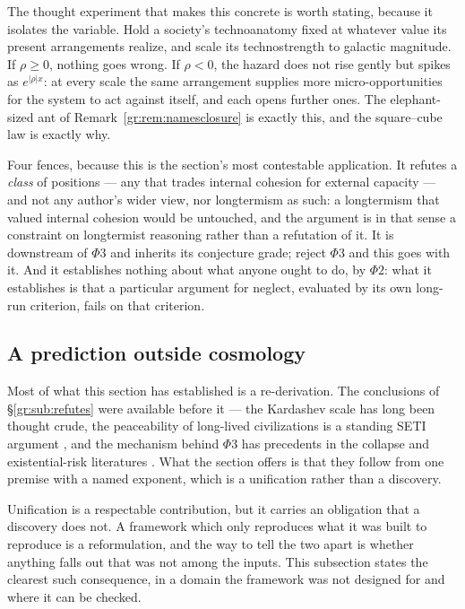 \documentclass[11pt]{article}
\numberwithin{equation}{section}
\theoremstyle{plain}
\theoremstyle{definition}
\theoremstyle{remark}
\begin{document}
The thought experiment that makes this concrete is worth stating,
because it isolates the variable. Hold a society's technoanatomy fixed
at whatever value its present arrangements realize, and scale its
technostrength to galactic magnitude. If $\rho\ge0$, nothing goes
wrong. If $\rho<0$, the hazard does not rise gently but spikes as
$e^{|\rho|x}$: at every scale the same arrangement supplies more
micro-opportunities for the system to act against itself, and each
opens further ones. The elephant-sized ant of
Remark~\ref{gr:rem:namesclosure} is exactly this, and the square--cube
law is exactly why.

Four fences, because this is the section's most contestable
application. It refutes a \emph{class} of positions --- any that trades
internal cohesion for external capacity --- and not any author's wider
view, nor longtermism as such: a longtermism that valued internal
cohesion would be untouched, and the argument is in that sense a
constraint on longtermist reasoning rather than a refutation of it. It is downstream of $\Phi3$ and inherits its conjecture grade;
reject $\Phi3$ and this goes with it. And it establishes nothing about
what anyone ought to do, by $\Phi2$: what it establishes is that a
particular argument for neglect, evaluated by its own long-run
criterion, fails on that criterion.

\subsection{A prediction outside cosmology}\label{gr:sub:crossdomain}

Most of what this section has established is a re-derivation. The
conclusions of \S\ref{gr:sub:refutes} were available before it --- the
Kardashev scale has long been thought crude, the peaceability of
long-lived civilizations is a standing SETI argument
\cite{Cooper19}, and the mechanism behind $\Phi3$ has precedents in
the collapse and existential-risk literatures
\cite{Tainter88,Bostrom19}. What the section offers is that they follow
from one premise with a named exponent, which is a unification rather
than a discovery.

Unification is a respectable contribution, but it carries an obligation
that a discovery does not. A framework which only reproduces what it was
built to reproduce is a reformulation, and the way to tell the two apart
is whether anything falls out that was not among the inputs. This
subsection states the clearest such consequence, in a domain the
framework was not designed for and where it can be checked.
\end{document}
